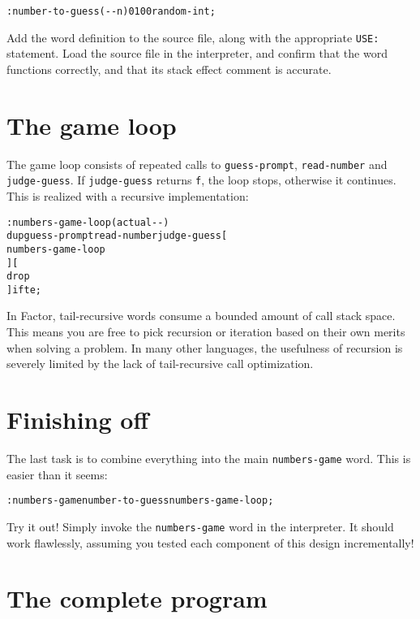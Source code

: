 \documentclass[english]{book}
\begin{document}
\begin{alltt}
: number-to-guess ( -{}- n ) 0 100 random-int ;
\end{alltt}
Add the word definition to the source file, along with the appropriate
\texttt{USE:} statement. Load the source file in the interpreter,
and confirm that the word functions correctly, and that its stack
effect comment is accurate.


\section{The game loop}

The game loop consists of repeated calls to \texttt{guess-prompt},
\texttt{read-number} and \texttt{judge-guess}. If \texttt{judge-guess}
returns \texttt{f}, the loop stops, otherwise it continues. This is
realized with a recursive implementation:

\begin{alltt}
: numbers-game-loop ( actual -{}- )
    dup guess-prompt read-number judge-guess {[}
        numbers-game-loop
    {]} {[}
        drop
    {]} ifte ;
\end{alltt}
In Factor, tail-recursive words consume a bounded amount of call stack
space. This means you are free to pick recursion or iteration based
on their own merits when solving a problem. In many other languages,
the usefulness of recursion is severely limited by the lack of tail-recursive
call optimization.


\section{Finishing off}

The last task is to combine everything into the main \texttt{numbers-game}
word. This is easier than it seems:

\begin{alltt}
: numbers-game number-to-guess numbers-game-loop ;
\end{alltt}
Try it out! Simply invoke the \texttt{numbers-game} word in the interpreter.
It should work flawlessly, assuming you tested each component of this
design incrementally!


\section{The complete program}
\end{document}

